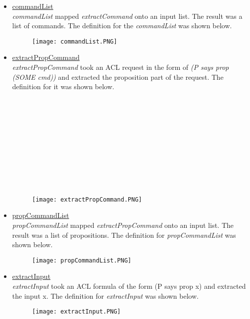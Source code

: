 \begin{itemize}
 \item \underline{commandList}\\
\emph{commandList} mapped \emph{extractCommand} onto an input list.  The result was a list of commands.  The definition for the \emph{commandList} was shown below.\\
  
  \begin{figure}[h]
  \centering
  \texttt{[image: commandList.PNG]}
\end{figure}

 \item \underline{extractPropCommand}\\
   \emph{extractPropCommand} took an ACL request in the form of \emph{(P says prop (SOME cmd))} and extracted the proposition part of the request.  The definition for it was shown below.\\\\\\\\\\\\\\\\\\\\\\
   
  \begin{figure}[h]
  \centering
  \texttt{[image: extractPropCommand.PNG]}
\end{figure}

\item \underline{propCommandList}\\
  \emph{propCommandList} mapped \emph{extractPropCommand} onto an input list.  The result was a list of propositions.  The definition for \emph{propCommandList} was shown below. \\
  
  \begin{figure}[h]
  \centering
  \texttt{[image: propCommandList.PNG]}
\end{figure}

 \item \underline{extractInput}\\
   \emph{extractInput} took an ACL formula of the form (P says prop x) and extracted the input x.  The definition for \emph{extractInput} was shown below.\\
   
  \begin{figure}[h]
  \centering
  \texttt{[image: extractInput.PNG]}
\end{figure}


\end{itemize}

